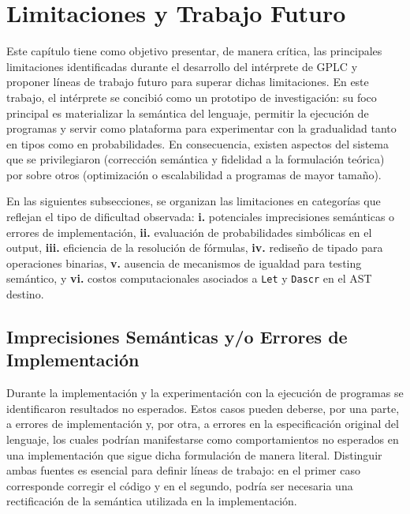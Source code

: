
\newpage
\section{Limitaciones y Trabajo Futuro}\label{sec:limitaciones-trabajo-futuro}


Este capítulo tiene como objetivo presentar, de
manera crítica, las principales limitaciones
identificadas durante el desarrollo del intérprete
de GPLC y proponer líneas de trabajo futuro para
superar dichas limitaciones. En este trabajo, el
intérprete se concibió como un prototipo de
investigación: su foco principal es materializar
la semántica del lenguaje, permitir la ejecución
de programas y servir como plataforma para
experimentar con la gradualidad tanto en tipos
como en probabilidades. En consecuencia, existen
aspectos del sistema que se privilegiaron
(corrección semántica y fidelidad a la formulación
teórica) por sobre otros (optimización o escalabilidad a
programas de mayor tamaño).



En las siguientes subsecciones, se organizan las
limitaciones en categorías que reflejan el tipo de
dificultad observada: \textbf{i.} potenciales
imprecisiones semánticas o errores de
implementación, \textbf{ii.} evaluación de probabilidades
simbólicas en el output, \textbf{iii.} eficiencia de la resolución de
fórmulas, \textbf{iv.} rediseño de tipado para operaciones
binarias, \textbf{v.} ausencia de mecanismos de igualdad
para testing semántico, y \textbf{vi.} costos
computacionales asociados a \lstinline|Let| y
\lstinline|Dascr| en el AST destino.

\subsection{Imprecisiones Semánticas y/o Errores de Implementación}\label{subsec:lim-bugs}

Durante la implementación y la experimentación con
la ejecución de programas se identificaron
resultados no esperados. Estos casos pueden
deberse, por una parte, a errores de
implementación y, por otra, a errores en la
especificación original del lenguaje, los cuales
podrían manifestarse como comportamientos no
esperados en una implementación que sigue dicha
formulación de manera literal. Distinguir ambas
fuentes es esencial para definir líneas de
trabajo: en el primer caso corresponde corregir el
código y en el segundo, podría ser necesaria una
rectificación de la semántica
utilizada en la implementación.



